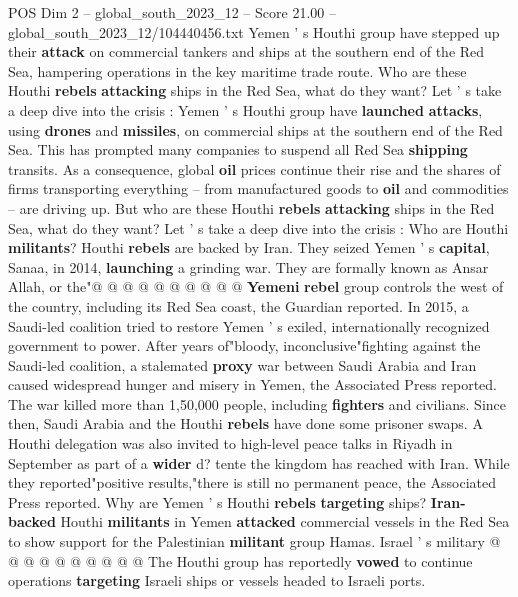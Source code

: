 \begin{textsample}{POS Dim 2 – global\_south\_2023\_12 – Score 21.00 – global\_south\_2023\_12/104440456.txt}  \label{ex:f2_pos_155}
Yemen ' s Houthi group have stepped up their \textbf{attack} on commercial tankers and ships at the southern end of the Red Sea, hampering operations in the key maritime trade route.
Who are these Houthi \textbf{rebels} \textbf{attacking} ships in the Red Sea, what do they want?
Let ' s take a deep dive into the crisis : Yemen ' s Houthi group have \textbf{launched} \textbf{attacks}, using \textbf{drones} and \textbf{missiles}, on commercial ships at the southern end of the Red Sea.
This has prompted many companies to suspend all Red Sea \textbf{shipping} transits.
As a consequence, global \textbf{oil} prices continue their rise and the shares of firms transporting everything -- from manufactured goods to \textbf{oil} and commodities -- are driving up.
But who are these Houthi \textbf{rebels} \textbf{attacking} ships in the Red Sea, what do they want?
Let ' s take a deep dive into the crisis : Who are Houthi \textbf{militants}?
Houthi \textbf{rebels} are backed by Iran.
They seized Yemen ' s \textbf{capital}, Sanaa, in 2014, \textbf{launching} a grinding war.
They are formally known as Ansar Allah, or the"@ @ @ @ @ @ @ @ @ @ \textbf{Yemeni} \textbf{rebel} group controls the west of the country, including its Red Sea coast, the Guardian reported.
In 2015, a Saudi-led coalition tried to restore Yemen ' s exiled, internationally recognized government to power.
After years of"bloody, inconclusive"fighting against the Saudi-led coalition, a stalemated \textbf{proxy} war between Saudi Arabia and Iran caused widespread hunger and misery in Yemen, the Associated Press reported.
The war killed more than 1,50,000 people, including \textbf{fighters} and civilians.
Since then, Saudi Arabia and the Houthi \textbf{rebels} have done some prisoner swaps.
A Houthi delegation was also invited to high-level peace talks in Riyadh in September as part of a \textbf{wider} d? tente the kingdom has reached with Iran.
While they reported"positive results,"there is still no permanent peace, the Associated Press reported.
Why are Yemen ' s Houthi \textbf{rebels} \textbf{targeting} ships? \textbf{Iran-backed} Houthi \textbf{militants} in Yemen \textbf{attacked} commercial vessels in the Red Sea to show support for the Palestinian \textbf{militant} group Hamas.
Israel ' s military @ @ @ @ @ @ @ @ @ @ The Houthi group has reportedly \textbf{vowed} to continue operations \textbf{targeting} Israeli ships or vessels headed to Israeli ports.

\end{textsample}
